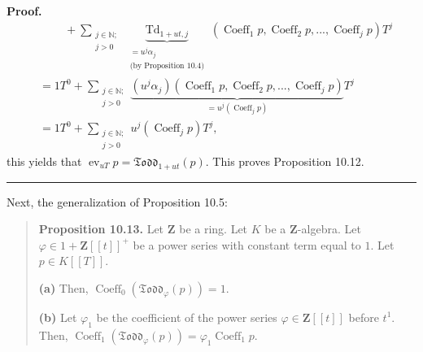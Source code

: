 \documentclass[numbers=enddot,12pt,final,onecolumn,notitlepage]{scrartcl}%
\newenvironment{proof}[1][Proof]{\noindent\textbf{#1.} }{\ \rule{0.5em}{0.5em}}
\begin{document}
\begin{proof}
\begin{align*}
&  \ \ \ \ \ \ \ \ \ \ +\sum_{\substack{j\in\mathbb{N};\\j>0}%
}\underbrace{\operatorname*{Td}\nolimits_{1+ut,j}}_{\substack{=u^{j}\alpha
_{j}\\\text{(by Proposition 10.4)}}}\left(  \operatorname*{Coeff}%
\nolimits_{1}p,\operatorname*{Coeff}\nolimits_{2}p,...,\operatorname*{Coeff}%
\nolimits_{j}p\right)  T^{j}\\
&  =1T^{0}+\sum_{\substack{j\in\mathbb{N};\\j>0}}\underbrace{\left(
u^{j}\alpha_{j}\right)  \left(  \operatorname*{Coeff}\nolimits_{1}%
p,\operatorname*{Coeff}\nolimits_{2}p,...,\operatorname*{Coeff}\nolimits_{j}%
p\right)  }_{=u^{j}\left(  \operatorname*{Coeff}\nolimits_{j}p\right)  }%
T^{j}\\
&  =1T^{0}+\sum_{\substack{j\in\mathbb{N};\\j>0}}u^{j}\left(
\operatorname*{Coeff}\nolimits_{j}p\right)  T^{j},
\end{align*}
this yields that $\operatorname*{ev}\nolimits_{uT}p=\mathfrak{Todd}%
_{1+ut}\left(  p\right)  $. This proves Proposition 10.12.
\end{proof}

Next, the generalization of Proposition 10.5:

\begin{quote}
\textbf{Proposition 10.13.} Let $\mathbf{Z}$ be a ring. Let $K$ be a
$\mathbf{Z}$-algebra. Let $\varphi\in1+\mathbf{Z}\left[  \left[  t\right]
\right]  ^{+}$ be a power series with constant term equal to $1$. Let $p\in
K\left[  \left[  T\right]  \right]  $.

\textbf{(a)} Then, $\operatorname*{Coeff}\nolimits_{0}\left(  \mathfrak{Todd}%
_{\varphi}\left(  p\right)  \right)  =1$.

\textbf{(b)} Let $\varphi_{1}$ be the coefficient of the power series
$\varphi\in\mathbf{Z}\left[  \left[  t\right]  \right]  $ before $t^{1}$.
Then, $\operatorname*{Coeff}\nolimits_{1}\left(  \mathfrak{Todd}_{\varphi
}\left(  p\right)  \right)  =\varphi_{1}\operatorname*{Coeff}\nolimits_{1}p$.
\end{quote}
\end{document}
